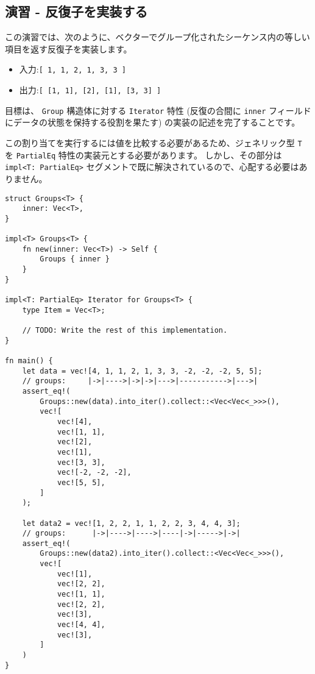 \subsection{演習 - 反復子を実装する}

この演習では、次のように、ベクターでグループ化されたシーケンス内の等しい項目を返す反復子を実装します。

\begin{itemize}
    \item 入力:\texttt{[ 1, 1, 2, 1, 3, 3 ]}
    \item 出力:\texttt{[ [1, 1], [2], [1], [3, 3] ]}
\end{itemize}

目標は、 \texttt{Group} 構造体に対する \texttt{Iterator} 特性 (反復の合間に \texttt{inner} フィールドにデータの状態を保持する役割を果たす) の実装の記述を完了することです。

この割り当てを実行するには値を比較する必要があるため、ジェネリック型 \texttt{T} を \texttt{PartialEq} 特性の実装元とする必要があります。 しかし、その部分は \texttt{impl<T: PartialEq>} セグメントで既に解決されているので、心配する必要はありません。

\begin{lstlisting}[numbers=none]
struct Groups<T> {
    inner: Vec<T>,
}

impl<T> Groups<T> {
    fn new(inner: Vec<T>) -> Self {
	    Groups { inner }
    }
}

impl<T: PartialEq> Iterator for Groups<T> {
    type Item = Vec<T>;

    // TODO: Write the rest of this implementation.
}

fn main() {
    let data = vec![4, 1, 1, 2, 1, 3, 3, -2, -2, -2, 5, 5];
    // groups:     |->|---->|->|->|--->|----------->|--->|
    assert_eq!(
	    Groups::new(data).into_iter().collect::<Vec<Vec<_>>>(),
	    vec![
	        vec![4],
    	    vec![1, 1],
	        vec![2],
    	    vec![1],
	        vec![3, 3],
	        vec![-2, -2, -2],
    	    vec![5, 5],
	    ]
    );

    let data2 = vec![1, 2, 2, 1, 1, 2, 2, 3, 4, 4, 3];
    // groups:      |->|---->|---->|----|->|----->|->|
    assert_eq!(
	    Groups::new(data2).into_iter().collect::<Vec<Vec<_>>>(),
	    vec![
	        vec![1],
    	    vec![2, 2],
	        vec![1, 1],
	        vec![2, 2],
    	    vec![3],
	        vec![4, 4],
	        vec![3],
	    ]
    )
}
\end{lstlisting}


